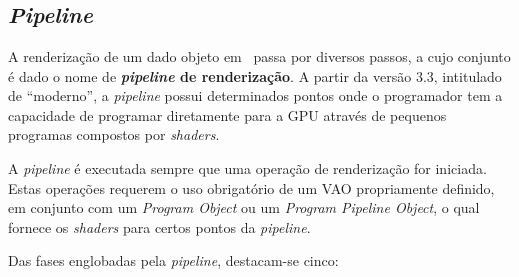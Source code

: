 \section{\opengl}
\label{sec::arte:opengl}

\subsection{\textit{Pipeline}}
\label{ssec::arte:opengl:pipeline}

A renderização de um dado objeto em \opengl~passa por diversos passos, a cujo conjunto é dado o nome de \textbf{\textit{pipeline} de renderização}. A partir da versão 3.3, intitulado de ``\opengl moderno'', a \textit{pipeline} possui determinados pontos onde o programador tem a capacidade de programar diretamente para a \ac{GPU} através de pequenos programas compostos por \textit{shaders}.

A \textit{pipeline} é executada sempre que uma operação de renderização for iniciada. Estas operações requerem o uso obrigatório de um \ac{VAO} propriamente definido, em conjunto com um \textit{Program Object} ou um \textit{Program Pipeline Object}, o qual fornece os \textit{shaders} para certos pontos da \textit{pipeline}.

Das fases englobadas pela \textit{pipeline}, destacam-se cinco:

